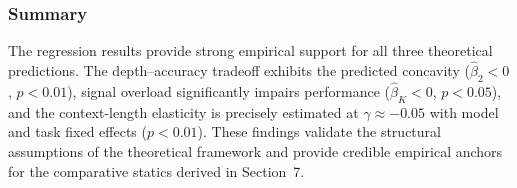 \subsubsection{Summary}

The regression results provide strong empirical support for all three theoretical predictions. The depth--accuracy tradeoff exhibits the predicted concavity ($\hat{\beta}_2 < 0$, $p{<}0.01$), signal overload significantly impairs performance ($\hat{\beta}_K < 0$, $p{<}0.05$), and the context-length elasticity is precisely estimated at $\hat{\gamma} \approx -0.05$ with model and task fixed effects ($p{<}0.01$). These findings validate the structural assumptions of the theoretical framework and provide credible empirical anchors for the comparative statics derived in Section~7.
